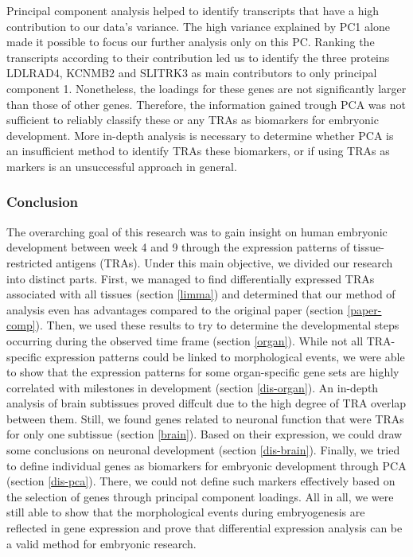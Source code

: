 \documentclass[
]{article}
\begin{document}
Principal component analysis helped to identify transcripts that have a high contribution to our data's variance. The high variance explained by PC1 alone made it possible to focus our further analysis only on this PC. Ranking the transcripts according to their contribution led us to identify the three proteins LDLRAD4, KCNMB2 and SLITRK3 as main contributors to only principal component 1. Nonetheless, the loadings for these genes are not significantly larger than those of other genes. Therefore, the information gained trough PCA was not sufficient to reliably classify these or any TRAs as biomarkers for embryonic development. More in-depth analysis is necessary to determine whether PCA is an insufficient method to identify TRAs these biomarkers, or if using TRAs as markers is an unsuccessful approach in general.

\hypertarget{conclusion}{%
\subsubsection{Conclusion}\label{conclusion}}

The overarching goal of this research was to gain insight on human embryonic development between week 4 and 9 through the expression patterns of tissue-restricted antigens (TRAs). Under this main objective, we divided our research into distinct parts. First, we managed to find differentially expressed TRAs associated with all tissues (section \ref{limma}) and determined that our method of analysis even has advantages compared to the original paper (section \ref{paper-comp}). Then, we used these results to try to determine the developmental steps occurring during the observed time frame (section \ref{organ}). While not all TRA-specific expression patterns could be linked to morphological events, we were able to show that the expression patterns for some organ-specific gene sets are highly correlated with milestones in development (section \ref{dis-organ}). An in-depth analysis of brain subtissues proved diffcult due to the high degree of TRA overlap between them. Still, we found genes related to neuronal function that were TRAs for only one subtissue (section \ref{brain}). Based on their expression, we could draw some conclusions on neuronal development (section \ref{dis-brain}). Finally, we tried to define individual genes as biomarkers for embryonic development through PCA (section \ref{dis-pca}). There, we could not define such markers effectively based on the selection of genes through principal component loadings. All in all, we were still able to show that the morphological events during embryogenesis are reflected in gene expression and prove that differential expression analysis can be a valid method for embryonic research.
\end{document}
